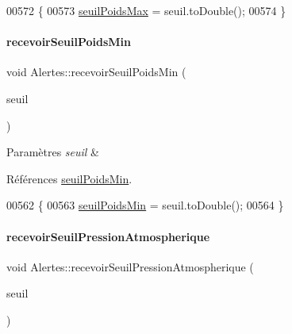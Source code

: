 \begin{DoxyCode}
00572 \{
00573     \hyperlink{class_alertes_a19b88c68325ccc6e5e8ad11a2537b25e}{seuilPoidsMax} = seuil.toDouble();
00574 \}
\end{DoxyCode}
\mbox{\label{class_alertes_ab6a15b0c8387a2cdf47dacce92c60383}} 
\paragraph{\texorpdfstring{recevoir\+Seuil\+Poids\+Min}{recevoirSeuilPoidsMin}}
{\footnotesize\ttfamily void Alertes\+::recevoir\+Seuil\+Poids\+Min (\begin{DoxyParamCaption}\item[{Q\+String}]{seuil }\end{DoxyParamCaption})\hspace{0.3cm}{\ttfamily [slot]}}


\begin{DoxyParams}{Paramètres}
{\em seuil} & \\
\hline
\end{DoxyParams}


Références \hyperlink{class_alertes_a3f23bee8122888916e33559f4d0bf34b}{seuil\+Poids\+Min}.


\begin{DoxyCode}
00562 \{
00563     \hyperlink{class_alertes_a3f23bee8122888916e33559f4d0bf34b}{seuilPoidsMin} = seuil.toDouble();
00564 \}
\end{DoxyCode}
\mbox{\label{class_alertes_a4496c251e1cde3e8c6beee64bad53fe3}} 
\paragraph{\texorpdfstring{recevoir\+Seuil\+Pression\+Atmospherique}{recevoirSeuilPressionAtmospherique}}
{\footnotesize\ttfamily void Alertes\+::recevoir\+Seuil\+Pression\+Atmospherique (\begin{DoxyParamCaption}\item[{Q\+String}]{seuil }\end{DoxyParamCaption})\hspace{0.3cm}{\ttfamily [slot]}}



